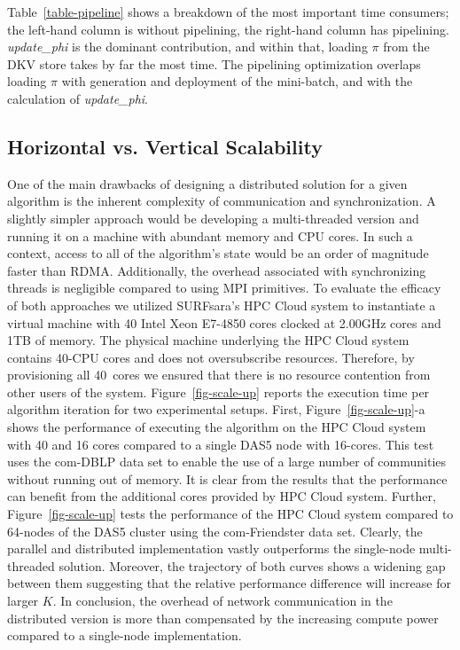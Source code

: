 Table~\ref{table-pipeline} shows a breakdown of the most important time
consumers; the left-hand column is without pipelining, the right-hand
column has pipelining. \textit{update\_phi} is the dominant contribution,
and within that, loading $\pi$ from the DKV store takes by far the most time.
The pipelining optimization overlaps loading $\pi$ with generation and
deployment of the mini-batch, and with the calculation of \textit{update\_phi}.

\subsection{Horizontal vs. Vertical Scalability}
\begin{figure*}[t] %
  \centering
  \caption{Performance comparison between the distributed implementation
  running on DAS5 and the multi-threaded solution on machine with 40-cores and
  1TB of RAM.}
  \label{fig-scale-up}
\end{figure*}
One of the main drawbacks of designing a distributed solution for a given
algorithm is the inherent complexity of communication and synchronization. A
slightly simpler approach would be developing a multi-threaded version and
running it on a machine with abundant memory and CPU cores. In such a context,
access to all of the algorithm's state would be an order of magnitude faster
than RDMA. Additionally, the overhead associated with synchronizing threads is
negligible compared to using MPI primitives. To evaluate the efficacy of both
approaches we utilized SURFsara's HPC Cloud system to instantiate a virtual
machine with 40 Intel Xeon E7-4850 cores clocked at 2.00GHz cores and 1TB of
memory. The physical machine underlying
the HPC Cloud system contains 40-CPU cores and does not oversubscribe
resources. Therefore, by provisioning all 40~cores we ensured that there is no
resource contention from other users of the system. Figure~\ref{fig-scale-up}
reports the execution time per algorithm iteration for two experimental setups.
%
First, Figure~\ref{fig-scale-up}-a shows the performance of executing the
algorithm on the HPC Cloud
system with 40 and 16 cores compared to a single DAS5 node with 16-cores. This
test uses the com-DBLP data set to enable the use of a large number of
communities without running out of memory. It is clear from the results that
the performance can benefit from the additional cores provided by HPC Cloud system.
%
Further, Figure~\ref{fig-scale-up} tests the performance of the HPC Cloud
system compared to 64-nodes of the DAS5
cluster using the com-Friendster data set. Clearly, the parallel and
distributed implementation vastly
outperforms the single-node multi-threaded solution. Moreover, the trajectory
of both curves shows a widening gap between them suggesting that the relative
performance difference will increase for larger $K$.
%
In conclusion, the overhead of network communication in the distributed version
is more than compensated by the increasing compute power compared to
a single-node implementation.

